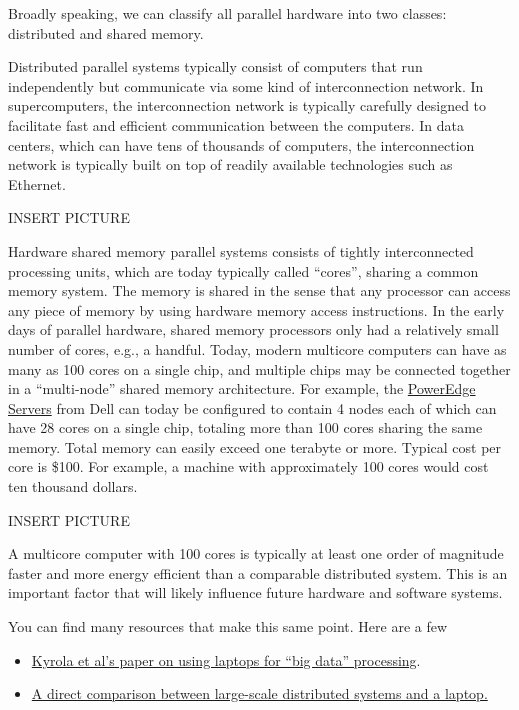 \begin{gram}
Broadly speaking, we can classify all parallel hardware into two classes: distributed and shared memory.
%

Distributed parallel systems typically consist of computers that run independently but communicate via some kind of interconnection network.
%
In supercomputers, the interconnection network is typically carefully designed to facilitate fast and efficient communication between the computers.
%
In data centers, which can have tens of thousands of computers, the interconnection network is typically built on top of readily available technologies such as Ethernet.

INSERT PICTURE

Hardware shared memory parallel systems consists of tightly interconnected processing units, which are today typically called ``cores'', sharing a common memory system.
%
The memory is shared in the sense that any processor can access any piece of memory by using hardware memory access instructions.
%
In the early days of parallel hardware, shared memory processors only had a relatively small number of cores, e.g., a handful.
%
Today, modern multicore computers can have as many as 100 cores on a single chip, and multiple chips may be connected together in a ``multi-node'' shared memory architecture.
%
For example,
%
the
\href{https://www.dell.com/en-us/work/shop/povw/poweredge-r940xa}{PowerEdge Servers}
%
from Dell can today be configured to contain 4 nodes each of which can have 28 cores on a single chip, totaling more than 100 cores sharing the same memory. 
%
Total memory can easily exceed one terabyte or more.
%
Typical cost per core is \$100.  
%
For example, a machine with approximately 100 cores would cost ten thousand dollars.

INSERT PICTURE

\end{gram}

\begin{remark}
A multicore computer with 100 cores is typically at least one order of magnitude faster and more energy efficient than a comparable distributed system.
%
This is an important factor that will likely influence future hardware and software systems. 
%

You can find many resources that make this same point. 
Here are a few
\begin{itemize}
\item 
\href{https://www.usenix.org/system/files/conference/osdi12/osdi12-final-126.pdf}
{Kyrola et al's paper on using laptops for ``big data'' processing}.
\item 
\href{http://www.frankmcsherry.org/graph/scalability/cost/2015/01/15/COST.html}
{A direct comparison between large-scale distributed systems and a laptop.}

\end{itemize}


\end{remark}


